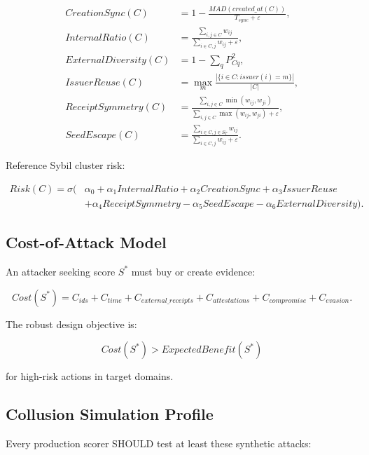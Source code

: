 \documentclass[11pt]{article}
\begin{document}
\begin{align}
CreationSync(C)&=1-\frac{MAD(created\_at(C))}{T_{sync}+\varepsilon},\\
InternalRatio(C)&=\frac{\sum_{i,j\in C}w_{ij}}{\sum_{i\in C,j}w_{ij}+\varepsilon},\\
ExternalDiversity(C)&=1-\sum_{q}P_{Cq}^{2},\\
IssuerReuse(C)&=\max_m\frac{|\{i\in C:issuer(i)=m\}|}{|C|},\\
ReceiptSymmetry(C)&=\frac{\sum_{i,j\in C}\min(w_{ij},w_{ji})}{\sum_{i,j\in C}\max(w_{ij},w_{ji})+\varepsilon},\\
SeedEscape(C)&=\frac{\sum_{i\in C,j\in S_T}w_{ij}}{\sum_{i\in C,j}w_{ij}+\varepsilon}.
\end{align}

Reference Sybil cluster risk:

\begin{equation}
\begin{aligned}
Risk(C)=\sigma(&\alpha_0+\alpha_1InternalRatio+\alpha_2CreationSync+\alpha_3IssuerReuse\\
&+\alpha_4ReceiptSymmetry-\alpha_5SeedEscape-\alpha_6ExternalDiversity).
\end{aligned}
\end{equation}

\subsection{Cost-of-Attack Model}

An attacker seeking score \(S^*\) must buy or create evidence:

\begin{equation}
Cost(S^*)=C_{ids}+C_{time}+C_{external\_receipts}+C_{attestations}+C_{compromise}+C_{evasion}.
\end{equation}

The robust design objective is:

\begin{equation}
Cost(S^*) > ExpectedBenefit(S^*)
\end{equation}

for high-risk actions in target domains.

\subsection{Collusion Simulation Profile}

Every production scorer SHOULD test at least these synthetic attacks:
\end{document}
